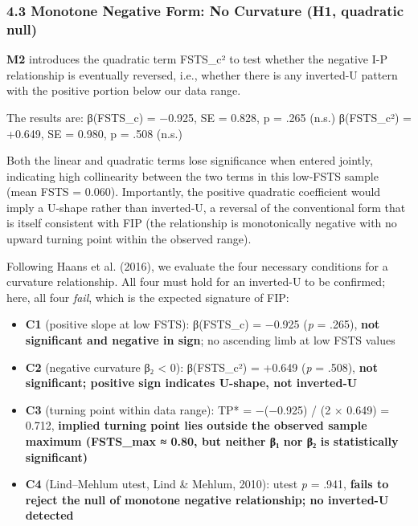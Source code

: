\documentclass[12pt,a4paper]{article}
\providecommand{\tightlist}{\setlength{\itemsep}{0pt}\setlength{\parskip}{0pt}}
\begin{document}
\hypertarget{43-monotone-negative-form-no-curvature-h1-quadratic-null}{%
\subsubsection{4.3 Monotone Negative Form: No Curvature (H1, quadratic
null)}\label{43-monotone-negative-form-no-curvature-h1-quadratic-null}}

\textbf{M2} introduces the quadratic term FSTS\_c² to test whether the
negative I-P relationship is eventually reversed, i.e., whether there is
any inverted-U pattern with the positive portion below our data range.

The results are: β(FSTS\_c) = −0.925, SE = 0.828, p = .265 (n.s.)
β(FSTS\_c²) = +0.649, SE = 0.980, p = .508 (n.s.)

Both the linear and quadratic terms lose significance when entered
jointly, indicating high collinearity between the two terms in this
low-FSTS sample (mean FSTS = 0.060). Importantly, the positive quadratic
coefficient would imply a U-shape rather than inverted-U, a reversal of
the conventional form that is itself consistent with FIP (the
relationship is monotonically negative with no upward turning point
within the observed range).

Following Haans et al. (2016), we evaluate the four necessary conditions
for a curvature relationship. All four must hold for an inverted-U to be
confirmed; here, all four \emph{fail}, which is the expected signature
of FIP:

\begin{itemize}
\tightlist
\item
  \textbf{C1} (positive slope at low FSTS): β(FSTS\_c) = −0.925
  (\emph{p} = .265), \textbf{not significant and negative in sign}; no
  ascending limb at low FSTS values
\item
  \textbf{C2} (negative curvature β₂ \textless{} 0): β(FSTS\_c²) =
  +0.649 (\emph{p} = .508), \textbf{not significant; positive sign
  indicates U-shape, not inverted-U}
\item
  \textbf{C3} (turning point within data range): TP* = −(−0.925) / (2 ×
  0.649) = 0.712, \textbf{implied turning point lies outside the
  observed sample maximum (FSTS\_max ≈ 0.80, but neither β₁ nor β₂ is
  statistically significant)}
\item
  \textbf{C4} (Lind--Mehlum utest, Lind \& Mehlum, 2010): utest \emph{p}
  = .941, \textbf{fails to reject the null of monotone negative
  relationship; no inverted-U detected}
\end{itemize}
\end{document}
